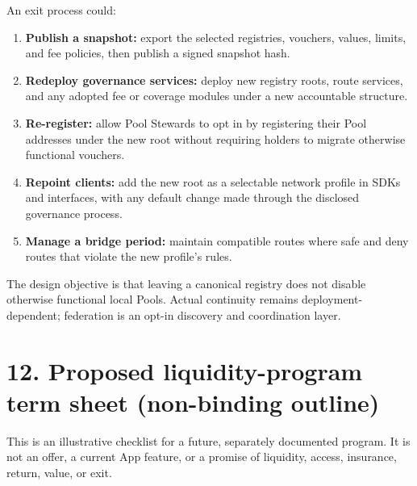 \documentclass[11pt]{article}
\begin{document}
An exit process could:

\begin{enumerate}[leftmargin=*]
\item \textbf{Publish a snapshot:} export the selected registries, vouchers, values, limits, and fee policies, then publish a signed snapshot hash.
\item \textbf{Redeploy governance services:} deploy new registry roots, route services, and any adopted fee or coverage modules under a new accountable structure.
\item \textbf{Re-register:} allow Pool Stewards to opt in by registering their Pool addresses under the new root without requiring holders to migrate otherwise functional vouchers.
\item \textbf{Repoint clients:} add the new root as a selectable network profile in SDKs and interfaces, with any default change made through the disclosed governance process.
\item \textbf{Manage a bridge period:} maintain compatible routes where safe and deny routes that violate the new profile's rules.
\end{enumerate}
The design objective is that leaving a canonical registry does not disable otherwise functional local Pools. Actual continuity remains deployment-dependent; federation is an opt-in discovery and coordination layer.


\section*{12. Proposed liquidity-program term sheet (non-binding outline)}

This is an illustrative checklist for a future, separately documented program. It is not an offer, a current App feature, or a promise of liquidity, access, insurance, return, value, or exit.
\end{document}
